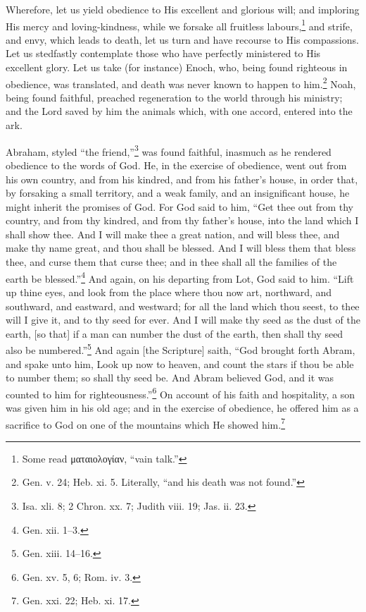 
Wherefore, let us yield obedience to His excellent and glorious will; and imploring His mercy and loving-kindness, while we forsake all fruitless labours,\footnote{Some read \textgreek{ματαιολογίαν}, “vain talk.”} and strife, and envy, which leads to death, let us turn and have recourse to His compassions. Let us stedfastly contemplate those who have perfectly ministered to His excellent glory. Let us take (for instance) Enoch, who, being found righteous in obedience, was translated, and death was never known to happen to him.\footnote{Gen. v. 24; Heb. xi. 5. Literally, “and his death was not found.”} Noah, being found faithful, preached regeneration to the world through his ministry; and the Lord saved by him the animals which, with one accord, entered into the ark.


Abraham, styled “the friend,”\footnote{Isa. xli. 8; 2 Chron. xx. 7; Judith viii. 19; Jas. ii. 23.} was found faithful, inasmuch as he rendered obedience to the words of God. He, in the exercise of obedience, went out from his own country, and from his kindred, and from his father’s house, in order that, by forsaking a small territory, and a weak family, and an insignificant house, he might inherit the promises of God. For God said to him, “Get thee out from thy country, and from thy kindred, and from thy father’s house, into the land which I shall show thee. And I will make thee a great nation, and will bless thee, and make thy name great, and thou shall be blessed. And I will bless them that bless thee, and curse them that curse thee; and in thee shall all the families of the earth be blessed.”\footnote{Gen. xii. 1–3.} And again, on his departing from Lot, God said to him. “Lift up thine eyes, and look from the place where thou now art, northward, and southward, and eastward, and westward; for all the land which thou seest, to thee will I give it, and to thy seed for ever. And I will make thy seed as the dust of the earth, [so that] if a man can number the dust of the earth, then shall thy seed also be numbered.”\footnote{Gen. xiii. 14–16.} And again [the Scripture] saith, “God brought forth Abram, and spake unto him, Look up now to heaven, and count the stars if thou be able to number them; so shall thy seed be. And Abram believed God, and it was counted to him for righteousness.”\footnote{Gen. xv. 5, 6; Rom. iv. 3.} On account of his faith and hospitality, a son  was given him in his old age; and in the exercise of obedience, he offered him as a sacrifice to God on one of the mountains which He showed him.\footnote{Gen. xxi. 22; Heb. xi. 17.}

